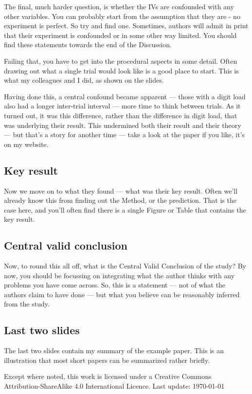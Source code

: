 \documentclass[12pt]{article}
\begin{document}
The final, much harder question, is whether the IVs are confounded
with any other variables. You can probably start from the assumption
that they are - no experiment is perfect. So try and find
one. Sometimes, authors will admit in print that their experiment is
confounded or in some other way limited. You should find these
statements towards the end of the Discussion.

Failing that, you have to get into the procedural aspects in some
detail. Often drawing out what a single trial would look like is a
good place to start. This is what my colleagues and I did, as shown on
the slides.

Having done this, a central confound became apparent --- those with a
digit load also had a longer inter-trial interval --- more time to
think between trials. As it turned out, it was this difference, rather
than the difference in digit load, that was underlying their
result. This undermined both their result and their theory --- but
that's a story for another time --- take a look at the paper if you
like, it's on my website.

\subsection{Key result}

Now we move on to what they found --- what was their key result. Often
we'll already know this from finding out the Method, or the
prediction. That is the case here, and you'll often find there is a
single Figure or Table that contains the key result.

\subsection{Central valid conclusion}

Now, to round this all off, what is the Central Valid Conclusion of
the study? By now, you should be focussing on integrating what the
author thinks with any problems you have come across. So, this is a
statement --- not of what the authors claim to have done --- but what
you believe can be reasonably inferred from the study.

\subsection{Last two slides}

The last two slides contain my summary of the example paper. This is
an illustration that most short papers can be summarized rather
briefly.

\vspace{12pt}

\tiny Except where noted, this work is licensed under a Creative
Commons Attribution-ShareAlike 4.0 International Licence. Last update:
\today
\end{document}
